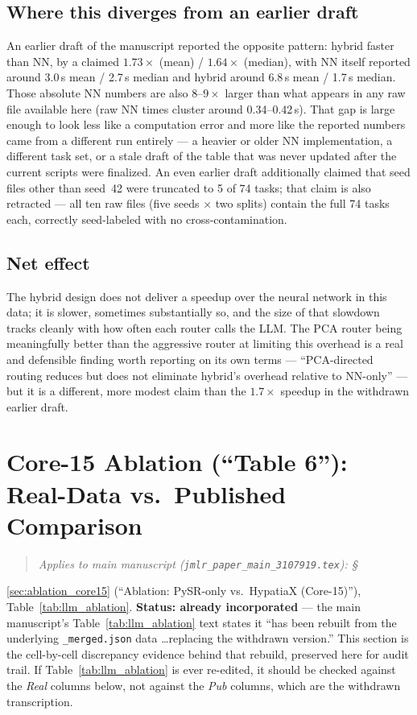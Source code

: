 \documentclass[11pt]{article}
\newenvironment{appliesto}[1]
  {\begin{quote}\small\itshape\noindent Applies to main manuscript
    (\texttt{jmlr\_paper\_main\_3107919.tex}): #1\end{quote}}
  {}
\begin{document}
\subsection{Where this diverges from an earlier draft}

An earlier draft of the manuscript reported the opposite pattern: hybrid
faster than NN, by a claimed $1.73\times$ (mean) / $1.64\times$ (median),
with NN itself reported around 3.0\,s mean / 2.7\,s median and hybrid
around 6.8\,s mean / 1.7\,s median. Those absolute NN numbers are also
$8$--$9\times$ larger than what appears in any raw file available here
(raw NN times cluster around 0.34--0.42\,s). That gap is large enough to
look less like a computation error and more like the reported numbers
came from a different run entirely --- a heavier or older NN
implementation, a different task set, or a stale draft of the table that
was never updated after the current scripts were finalized. An even
earlier draft additionally claimed that seed files other than seed~42
were truncated to 5 of 74 tasks; that claim is also retracted --- all ten
raw files (five seeds $\times$ two splits) contain the full 74 tasks
each, correctly seed-labeled with no cross-contamination.

\subsection{Net effect}

The hybrid design does not deliver a speedup over the neural network in
this data; it is slower, sometimes substantially so, and the size of
that slowdown tracks cleanly with how often each router calls the LLM.
The PCA router being meaningfully better than the aggressive router at
limiting this overhead is a real and defensible finding worth reporting
on its own terms --- ``PCA-directed routing reduces but does not
eliminate hybrid's overhead relative to NN-only'' --- but it is a
different, more modest claim than the $1.7\times$ speedup in the
withdrawn earlier draft.

\clearpage
\section{Core-15 Ablation (``Table 6''): Real-Data vs.\ Published Comparison}
\label{supp:table6}

\begin{appliesto}
\S\ref{sec:ablation_core15} (``Ablation: PySR-only vs.\ HypatiaX
(Core-15)''), Table~\ref{tab:llm_ablation}. \textbf{Status: already
incorporated} --- the main manuscript's Table~\ref{tab:llm_ablation} text
states it ``has been rebuilt from the underlying \texttt{\_merged.json}
data \ldots replacing the withdrawn version.'' This section is the
cell-by-cell discrepancy evidence behind that rebuild, preserved here for
audit trail. If Table~\ref{tab:llm_ablation} is ever re-edited, it should
be checked against the \emph{Real} columns below, not against the
\emph{Pub} columns, which are the withdrawn transcription.
\end{appliesto}
\end{document}
